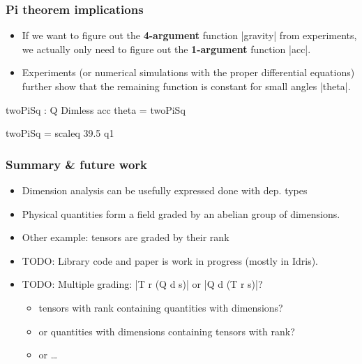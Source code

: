 \documentclass{beamer}
\begin{document}
\begin{frame}
\frametitle{Pi theorem implications}
\begin{itemize}
\item If we want to figure out the \textbf{4-argument} function
  |gravity| from experiments, we actually only need to figure out the
  \textbf{1-argument} function |acc|.
\item Experiments (or numerical simulations with the proper
  differential equations) further show that the remaining function is
  constant for small angles |theta|.
\end{itemize}

\begin{code}
  twoPiSq : Q Dimless
  acc theta = twoPiSq

  twoPiSq = scaleq 39.5 q1
\end{code}

\end{frame}
\begin{frame}
\frametitle{Summary \& future work}
\begin{itemize}
\item Dimension analysis can be usefully expressed done with dep. types
\item Physical quantities form a field graded by an abelian group of
  dimensions.
\item Other example: tensors are graded by their rank
\item TODO: Library code and paper is work in progress (mostly in Idris).
\item TODO: Multiple grading: |T r (Q d s)| or |Q d (T r s)|?
  \begin{itemize}
  \item tensors with rank containing quantities with dimensions?
  \item or quantities with dimensions containing tensors with rank?
  \item or \ldots{}
  \end{itemize}
\end{itemize}
\end{frame}
\end{document}
